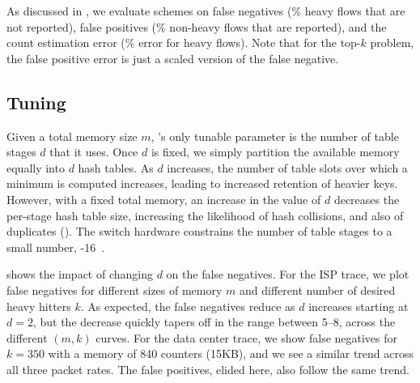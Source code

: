 

 As discussed in , we evaluate schemes on
false negatives (\% heavy flows that are not reported), false positives (\%
non-heavy flows that are reported), and the count estimation error (\% error for
heavy flows). Note that for the top-$k$ problem, the false positive error is
just a scaled version of the false negative.

\subsection{Tuning \TheSystem}
\label{subsec:sensitivity}

Given a total memory size $m$, \TheSystem's only tunable parameter is the number
of table stages $d$ that it uses. Once $d$ is fixed, we simply partition the
available memory equally into $d$ hash tables. As $d$ increases, the number of
table slots over which a minimum is computed increases, leading to increased
retention of heavier keys. However, with a fixed total memory, an increase in
the value of $d$ decreases the per-stage hash table size, increasing the
likelihood of hash collisions, and also of duplicates
(). The switch hardware constrains the number of table
stages to a small number, -16~\cite{intel-fm6000, RMT}.

 shows the impact of changing $d$ on the false negatives. For
the ISP trace, we plot false negatives for different sizes of memory $m$ and
different number of desired heavy hitters $k$. As expected, the false negatives
reduce as $d$ increases starting at $d=2$, but the decrease quickly tapers off
in the range between 5--8, across the different $(m,k)$ curves. For the data
center trace, we show false negatives for $k=350$ with a memory of 840 counters
(15KB), and we see a similar trend across all three packet rates. The false
positives, elided here, also follow the same trend.

